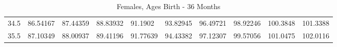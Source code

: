 \documentclass[10pt,twocolumn,letterpaper]{article}
\begin{document}
\begin{table}
\begin{tabular}{llllllllll}
    34.5            & 86.54167                               & 87.44359                               & 88.83932                                & 91.1902                                 & 93.82945                                & 96.49721                                & 98.92246                                & 100.3848                                & 101.3388                                \\
    35.5            & 87.10349                               & 88.00937                               & 89.41196                                & 91.77639                                & 94.43382                                & 97.12307                                & 99.57056                                & 101.0475                                & 102.0116                                \\
    \end{tabular}
    \caption {Females, Ages Birth - 36 Months}
\end{table}

\twocolumns
\nocite{*}
{\small


}
\end{document}
